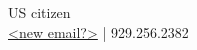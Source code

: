 \documentclass[letterpaper]{deedy-resume-openfont} %
\begin{document}

\lastupdated %

{
US citizen \\
\href{<new email?>}{<new email?>} | 929.256.2382 
}

\end{document}
